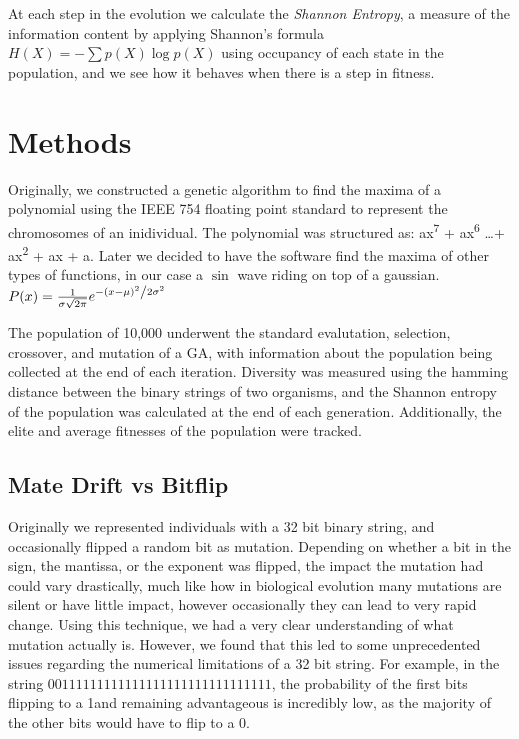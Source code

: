 \documentclass[11pt]{article}
\begin{document}
At each step in the evolution we calculate the \emph{Shannon Entropy},
a measure of the information content by applying Shannon's formula $H(X) = -\sum p(X)\log p(X)$ using occupancy of each state in the population, and we see how it behaves when there is a step in fitness.




\section{Methods}
\label{sec:org2c55902}

Originally, we constructed a genetic algorithm to find the maxima of a
polynomial using the IEEE 754 floating point standard to represent the
chromosomes of an inidividual. The polynomial was structured as: ax\textsuperscript{7}
+ ax\textsuperscript{6} \ldots + ax\textsuperscript{2} + ax + a. Later we
decided to have the software find the maxima of other types of functions,
in our case a $\sin$ wave riding on top of a gaussian. $ P(x) = \frac{1}{{\sigma \sqrt {2\pi } }} e^{{{ - \left( {x - \mu} \right)^2 } \mathord{\left/ {\vphantom {{ - \left( {x - \mu } \right)^2 } {2\sigma ^2 }}} \right. \kern-\nulldelimiterspace} {2\sigma ^2 }}} $

The population of 10,000 underwent the standard evalutation, selection,
crossover, and mutation of a  GA, with information about the population
being collected at the end of each iteration. Diversity was measured using
the hamming distance between the binary strings of two organisms, and the
Shannon entropy of the population was calculated at the end of each generation.
Additionally, the elite and average fitnesses of the population were tracked.

\subsection{Mate Drift vs Bitflip}
Originally we represented individuals with a 32 bit binary string, and occasionally 
flipped a random bit as mutation. Depending on whether a bit in the sign, the mantissa, 
or the exponent was flipped, the impact the mutation had could vary drastically,
much like how in biological evolution many mutations are silent or have little impact,
 however occasionally  they can lead to very rapid change. Using this technique,
 we had a very clear understanding of what mutation actually is. However, we found 
that this led to some unprecedented issues regarding the numerical limitations
of a 32 bit string. For example, in the string $0 01111111 11111111111111111111111$,
the probability of the first bits flipping to a 1and remaining advantageous is incredibly
low, as the majority of the other bits would have to flip to a 0.
\end{document}
